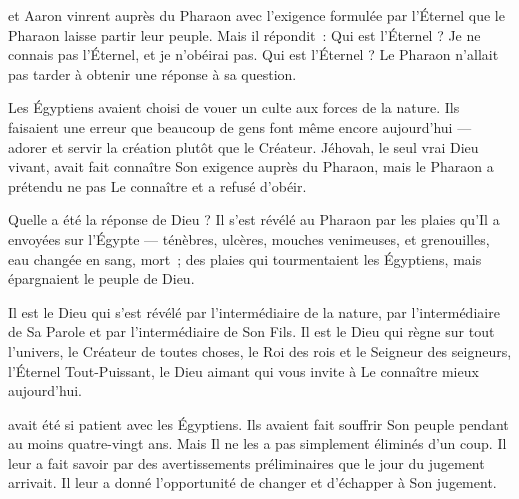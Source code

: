  et Aaron vinrent auprès du Pharaon
 avec l'exigence formulée par l'Éternel que le Pharaon
 laisse partir leur peuple.
 Mais il répondit~: \og Qui est l'Éternel ? Je ne connais pas l'Éternel,
 et je n'obéirai pas. \fg{}
 Qui est l'Éternel ? Le Pharaon n'allait pas tarder
 à obtenir une réponse à sa question.

Les Égyptiens avaient choisi de vouer un culte aux forces de la nature.
 Ils faisaient une erreur que beaucoup de gens font même encore aujourd'hui
 --- adorer et servir la création plutôt que le Créateur.
 Jéhovah, le seul vrai Dieu vivant, avait fait connaître Son exigence
 auprès du Pharaon, mais le Pharaon a prétendu
 ne pas Le connaître et a refusé d'obéir.

Quelle a été la réponse de Dieu ? Il s'est révélé au Pharaon
 par les plaies qu'Il a envoyées sur l'Égypte
 --- ténèbres, ulcères, mouches venimeuses, et grenouilles,
 eau changée en sang, mort~; des plaies qui tourmentaient les Égyptiens,
 mais épargnaient le peuple de Dieu.


Il est le Dieu qui s'est révélé par l'intermédiaire de la nature,
 par l'intermédiaire de Sa Parole et par l'intermédiaire de Son Fils.
 Il est le Dieu qui règne sur tout l'univers, le Créateur de toutes choses,
 le Roi des rois et le Seigneur des seigneurs,
 l'Éternel Tout-Puissant, le Dieu aimant
 qui vous invite à Le connaître mieux aujourd'hui. 

\dvrule






 avait été si patient avec les Égyptiens.
 Ils avaient fait souffrir Son peuple pendant au moins quatre-vingt ans.
 Mais Il ne les a pas simplement éliminés d'un coup.
 Il leur a fait savoir par des avertissements préliminaires
 que le jour du jugement arrivait.
 Il leur a donné l'opportunité de changer et d'échapper à Son jugement.

